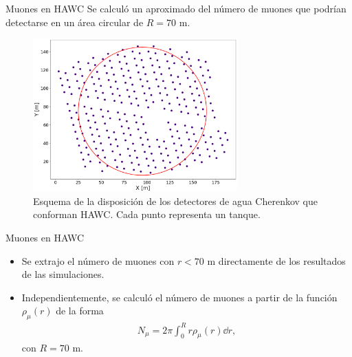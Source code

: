 \documentclass[10pt,xcolor=table]{beamer}
\begin{document}
%

\begin{frame}{Muones en HAWC}
Se calcul\'o un aproximado del n\'umero de muones que podr\'ian detectarse en un \'area circular de $R=70$ m.
\vspace{0.3cm}
	\begin{center}
	\begin{figure}
	\includegraphics[width=0.7\textwidth]{Figuras/HAWC_array.png}
	\caption{\footnotesize{ Esquema de la disposici\'on de los detectores de agua Cherenkov que conforman HAWC. Cada punto representa un tanque.}}
	\end{figure}
	\end{center}
\end{frame}

\begin{frame}{Muones en HAWC}
\begin{itemize}
\item Se extrajo el n\'umero de muones con $r<70$ m directamente de los resultados de las simulaciones.
\vspace{0.5cm}
\item Independientemente, se calcul\'o el n\'umero de muones a partir de la funci\'on $\rho_{\mu}(r)$ de la forma
	\begin{align*}
	N_{\mu} = 2 \pi \int_0^R r \rho_{\mu}(r) \dd{r},
	\end{align*}
con $R=70$ m.
\end{itemize}
\end{frame}
\end{document}
